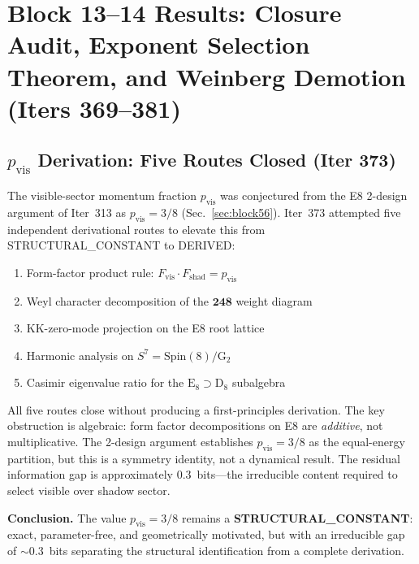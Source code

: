 \documentclass[aps,prd,twocolumn,superscriptaddress,floatfix,nofootinbib]{revtex4-2}
\theoremstyle{definition}
\theoremstyle{remark}
\begin{document}
\section{Block 13--14 Results: Closure Audit, Exponent Selection Theorem, and Weinberg Demotion (Iters 369--381)}
\label{sec:block1314}

\subsection{$p_{\mathrm{vis}}$ Derivation: Five Routes Closed (Iter 373)}
\label{sec:pvis-closure}

The visible-sector momentum fraction $p_{\mathrm{vis}}$ was conjectured from the
E8 2-design argument of Iter~313 as $p_{\mathrm{vis}} = 3/8$ (Sec.~\ref{sec:block56}).
Iter~373 attempted five independent derivational routes to elevate this from
STRUCTURAL\_CONSTANT to DERIVED:

\begin{enumerate}
  \item Form-factor product rule: $F_{\mathrm{vis}} \cdot F_{\mathrm{shad}} = p_{\mathrm{vis}}$
  \item Weyl character decomposition of the $\mathbf{248}$ weight diagram
  \item KK-zero-mode projection on the E8 root lattice
  \item Harmonic analysis on $S^7 = \mathrm{Spin}(8)/\mathrm{G}_2$
  \item Casimir eigenvalue ratio for the $\mathrm{E}_8 \supset \mathrm{D}_8$ subalgebra
\end{enumerate}

All five routes close without producing a first-principles derivation.  The key
obstruction is algebraic: form factor decompositions on E8 are \textit{additive},
not multiplicative.  The 2-design argument establishes $p_{\mathrm{vis}} = 3/8$
as the equal-energy partition, but this is a symmetry identity, not a dynamical
result.  The residual information gap is approximately $0.3$~bits---the irreducible
content required to select visible over shadow sector.

\textbf{Conclusion.}  The value $p_{\mathrm{vis}} = 3/8$ remains a
\textbf{STRUCTURAL\_CONSTANT}: exact, parameter-free, and geometrically motivated,
but with an irreducible gap of ${\sim}0.3$~bits separating the structural identification
from a complete derivation.
\end{document}
